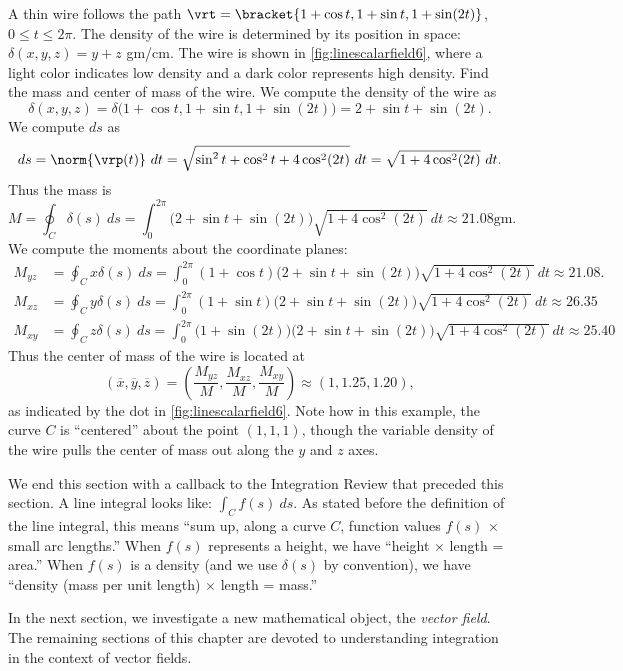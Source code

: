 {A thin wire follows the path $\vrt =\bracket{1+\cos t,1+\sin t, 1+ \sin(2t)}$, $0\leq t\leq 2\pi$. The density of the wire is determined by its position in space: $\delta(x,y,z) = y+z$ gm/cm. The wire is shown in \autoref{fig:linescalarfield6}, where a light color indicates low density and a dark color represents high density. Find the mass  and center of mass of the wire.%
}
{We compute the density of the wire as 
\[
\delta(x,y,z) = \delta\big(1+\cos t,1+\sin t, 1+\sin(2t)\big) = 2+\sin t+\sin(2t).
\]
We compute $ds$ as
\[
ds = \norm{\vrp(t)}\ dt = \sqrt{\sin^2t+\cos^2t+4\cos^2(2t)}\ dt
= \sqrt{1+4\cos^2(2t)}\ dt.
\]
Thus the mass is
\[
M = \oint_C \delta(s)\ ds = \int_0^{2\pi} \big(2+\sin t+\sin(2t)\big)\sqrt{1+4\cos^2(2t)}\ dt
\approx 21.08\text{gm}.
\]
We compute the moments about the coordinate planes:\small
\begin{align*}
M_{yz} &= \oint_C x\delta(s)\ ds = \int_0^{2\pi}(1+\cos t)\big(2+\sin t+\sin(2t)\big)\sqrt{1+4\cos^2(2t)}\ dt \approx 21.08. \\
M_{xz} &= \oint_C y\delta(s)\ ds = \int_0^{2\pi}(1+\sin t)\big(2+\sin t+\sin(2t)\big)\sqrt{1+4\cos^2(2t)}\ dt \approx
26.35\\
M_{xy} &= \oint_C z\delta(s)\ ds = \int_0^{2\pi}\big(1+\sin(2 t)\big)\big(2+\sin t+\sin(2t)\big)\sqrt{1+4\cos^2(2t)}\ dt \approx 25.40
\end{align*}\normalsize
Thus the center of mass of the wire is located at 
\[
(\overline{x},\overline{y},\overline{z})
=\left(\frac{M_{yz}}M, \frac{M_{xz}}M,\frac{M_{xy}}M\right) \approx (1,1.25,1.20),
\]
as indicated by the dot in \autoref{fig:linescalarfield6}. Note how in this example, the curve $C$ is ``centered'' about the point $(1,1,1)$, though the variable density of the wire pulls the center of mass out along the $y$ and $z$ axes.}

We end this section with a callback to the Integration Review that preceded this section. A line integral looks like: $\int_C f(s)\ ds$. As stated before the definition of the line integral, this means ``sum up, along a curve $C$, function values $f(s)$ $\times$ small arc lengths.'' When $f(s)$ represents a height, we have ``height $\times$ length = area.'' When $f(s)$ is a density (and we use $\delta(s)$ by convention), we have ``density (mass per unit length) $\times$ length = mass.''

In the next section, we investigate a new mathematical object, the \emph{vector field}. The remaining sections of this chapter are devoted to understanding integration in the context of vector fields.


